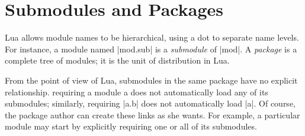 \section{Submodules and Packages}
Lua allows module names to be hierarchical, using a dot to separate name levels. For instance, a module named |mod.sub| is a \textit{submodule} of |mod|. A \textit{package} is a complete tree of modules; it is the unit of distribution in Lua. 

From the point of view of Lua, submodules in the same package have no explicit relationship. requiring a module a does not automatically load any of its submodules; similarly, requiring |a.b| does not automatically load |a|. Of course, the package author can create these links as she wants. For example, a particular module may start by explicitly requiring one or all of its submodules.

 











 